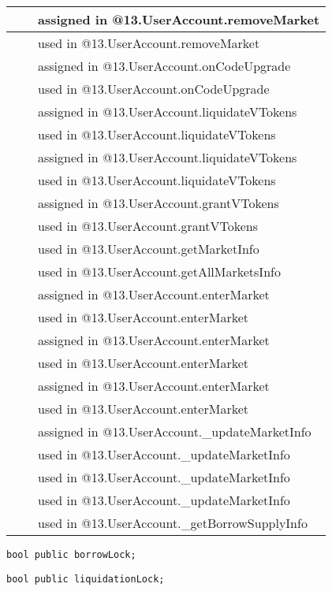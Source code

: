 \begin{tabular}{|l|l|p{5cm}|}
 & & assigned in @13.UserAccount.removeMarket\\\hline
 & & used in @13.UserAccount.removeMarket\\\hline
 & & assigned in @13.UserAccount.onCodeUpgrade\\\hline
 & & used in @13.UserAccount.onCodeUpgrade\\\hline
 & & assigned in @13.UserAccount.liquidateVTokens\\\hline
 & & used in @13.UserAccount.liquidateVTokens\\\hline
 & & assigned in @13.UserAccount.liquidateVTokens\\\hline
 & & used in @13.UserAccount.liquidateVTokens\\\hline
 & & assigned in @13.UserAccount.grantVTokens\\\hline
 & & used in @13.UserAccount.grantVTokens\\\hline
 & & used in @13.UserAccount.getMarketInfo\\\hline
 & & used in @13.UserAccount.getAllMarketsInfo\\\hline
 & & assigned in @13.UserAccount.enterMarket\\\hline
 & & used in @13.UserAccount.enterMarket\\\hline
 & & assigned in @13.UserAccount.enterMarket\\\hline
 & & used in @13.UserAccount.enterMarket\\\hline
 & & assigned in @13.UserAccount.enterMarket\\\hline
 & & used in @13.UserAccount.enterMarket\\\hline
 & & assigned in @13.UserAccount.\_{}updateMarketInfo\\\hline
 & & used in @13.UserAccount.\_{}updateMarketInfo\\\hline
 & & used in @13.UserAccount.\_{}updateMarketInfo\\\hline
 & & used in @13.UserAccount.\_{}updateMarketInfo\\\hline
 & & used in @13.UserAccount.\_{}getBorrowSupplyInfo\\\hline
\end{tabular}
\fi


\begin{lstlisting}[firstnumber=20]
    bool public borrowLock;
\end{lstlisting}

\begin{lstlisting}[firstnumber=21]
    bool public liquidationLock;
\end{lstlisting}

